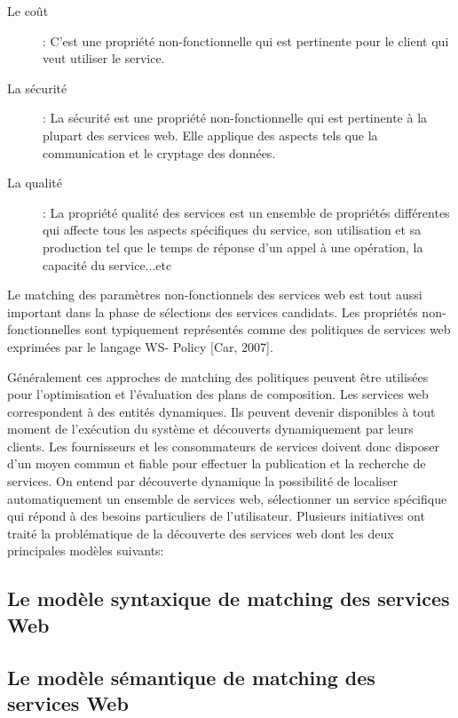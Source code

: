   \SpecialItem
  \begin{description}
  \item [Le coût]: C’est une propriété non-fonctionnelle qui est
    pertinente pour le client qui veut utiliser le service.

  \item [La sécurité]: La sécurité est une propriété non-fonctionnelle
    qui est pertinente à la plupart des services web. Elle applique
    des aspects tels que la communication et le cryptage des données.

  \item [La qualité]: La propriété qualité des services est un
    ensemble de propriétés différentes qui affecte tous les aspects
    spécifiques du service, son utilisation et sa production tel que
    le temps de réponse d'un appel à une opération, la capacité du
    service...etc
  \end{description}

  Le matching des paramètres non-fonctionnels des services web est
  tout aussi important dans la phase de sélections des services
  candidats. Les propriétés non-fonctionnelles sont typiquement
  représentés comme des politiques de services web exprimées par le
  langage WS- Policy [Car, 2007].

  Généralement ces approches de matching des politiques peuvent être
  utilisées pour l'optimisation et l’évaluation des plans de
  composition.  Les services web correspondent à des entités
  dynamiques. Ils peuvent devenir disponibles à tout moment de
  l’exécution du système et découverts dynamiquement par leurs
  clients. Les fournisseurs et les consommateurs de services doivent
  donc disposer d’un moyen commun et fiable pour effectuer la
  publication et la recherche de services. On entend par découverte
  dynamique la possibilité de localiser automatiquement un ensemble de
  services web, sélectionner un service spécifique qui répond à des
  besoins particuliers de l’utilisateur.  Plusieurs initiatives ont
  traité la problématique de la découverte des services web dont les
  deux principales modèles suivants:

  \subsection{Le modèle syntaxique de matching des services Web}
  \label{sec:le-modele-syntaxique}

  \subsection{Le modèle sémantique de matching des services Web}
  \label{sec:le-modele-semantique}

